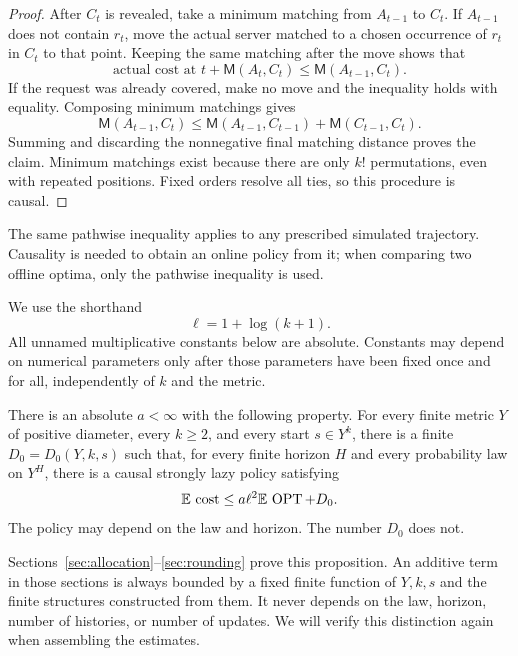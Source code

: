\begin{proof}
After \(C_t\) is revealed, take a minimum matching from \(A_{t-1}\)
to \(C_t\). If \(A_{t-1}\) does not contain \(r_t\), move the actual
server matched to a chosen occurrence of \(r_t\) in \(C_t\) to that
point. Keeping the same matching after the move shows that
\[
 \text{actual cost at }t+\mathsf M(A_t,C_t)
 \le \mathsf M(A_{t-1},C_t).
\]
If the request was already covered, make no move and the inequality
holds with equality. Composing minimum matchings gives
\[
 \mathsf M(A_{t-1},C_t)
 \le \mathsf M(A_{t-1},C_{t-1})
       +\mathsf M(C_{t-1},C_t).
\]
Summing and discarding the nonnegative final matching distance proves
the claim. Minimum matchings exist because there are only \(k!\)
permutations, even with repeated positions. Fixed orders resolve all
ties, so this procedure is causal.
\end{proof}

The same pathwise inequality applies to any prescribed simulated
trajectory. Causality is needed to obtain an online policy from it;
when comparing two offline optima, only the pathwise inequality is
used.

We use the shorthand
\[
                         \ell=1+\log(k+1).
\]
All unnamed multiplicative constants below are absolute. Constants may
depend on numerical parameters only after those parameters have been
fixed once and for all, independently of \(k\) and the metric.

\begin{proposition}\label{prop:finite-law}
There is an absolute \(a<\infty\) with the following property. For every
finite metric \(Y\) of positive diameter, every \(k\ge2\), and every
start \(s\in Y^k\), there is a finite \(D_0=D_0(Y,k,s)\) such that,
for every finite horizon \(H\) and every probability law on \(Y^H\),
there is a causal strongly lazy policy satisfying
\begin{equation}\label{eq:finite-law}
             \mathbb E\,\operatorname{cost}\le a\ell^2\mathbb E\,\operatorname{OPT}+D_0 .
\end{equation}
The policy may depend on the law and horizon. The number \(D_0\)
does not.
\end{proposition}

Sections~\ref{sec:allocation}--\ref{sec:rounding} prove this
proposition. An additive term in those sections is always bounded by
a fixed finite function of \(Y,k,s\) and the finite structures
constructed from them. It never depends on the law, horizon, number
of histories, or number of updates. We will verify this distinction
again when assembling the estimates.

